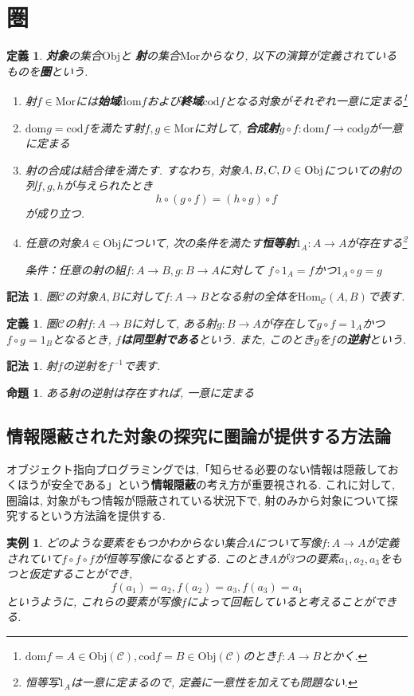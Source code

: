 \documentclass[dvipdfmx]{jsbook}
\theoremstyle{plain}
\newtheorem{Def}[thm]{定義}
\newtheorem{Notation}[thm]{記法}
\newtheorem{Prop}[thm]{命題}
\newtheorem{example}[thm]{実例}
\begin{document}
\section{圏}
\begin{Def}
{\bf 対象}の集合$\mathrm{Obj}$と
{\bf 射}の集合$\mathrm{Mor}$からなり, 以下の演算が定義されているものを{\bf 圏}という.
\begin{enumerate}
\item 射$f\in\mathrm{Mor}$には{\bf 始域}$\mathrm{dom}f$および{\bf 終域}$\mathrm{cod}f$となる対象がそれぞれ一意に定まる\footnote{$\mathrm{dom}f=A\in\mathrm{Obj}(\mathscr{C}),\mathrm{cod}f=B\in\mathrm{Obj}(\mathscr{C})$のとき$f:A\rightarrow B$とかく.}
\item $\mathrm{dom} g=\mathrm{cod}f$を満たす射$f,g\in\mathrm{Mor}$に対して,
{\bf 合成射}$g\circ f:\mathrm{dom}f\rightarrow\mathrm{cod}g$が一意に定まる
\item 射の合成は結合律を満たす. すなわち, 対象$A,B,C,D\in\rm{Obj}$についての射の列$f,g,h$が与えられたとき
\[
h\circ(g\circ f)=(h\circ g)\circ f
\]
が成り立つ.
\item 任意の対象$A\in\mathrm{Obj}$について,
次の条件を満たす{\bf 恒等射}$1_{A}:A\rightarrow A$が存在する\footnote{恒等写$1_{A}$は一意に定まるので, 定義に一意性を加えても問題ない.}

条件：任意の射の組$f:A\rightarrow B, g:B\rightarrow A$に対して
$f\circ 1_A=f$かつ$1_A\circ g=g$
\end{enumerate}
\end{Def}
\begin{Notation}
圏$\mathscr{C}$の対象$A,B$に対して$f:A\rightarrow B$となる射の全体を$\mathrm{Hom}_{\mathscr{C}}(A,B)$で表す.
\end{Notation}
\begin{Def}
圏$\mathscr{C}$の射$f:A\rightarrow B$に対して,
ある射$g:B\rightarrow A$が存在して$g\circ f=1_A$かつ$f\circ g=1_B$となるとき,
{\bf $f$は同型射である}という. また, このとき$g$を$f$の{\bf 逆射}という.
\end{Def}
\begin{Notation}
射$f$の逆射を$f^{-1}$で表す.
\end{Notation}
\begin{Prop}
ある射の逆射は存在すれば, 一意に定まる
\end{Prop}
\subsection{情報隠蔽された対象の探究に圏論が提供する方法論}
オブジェクト指向プログラミングでは,「知らせる必要のない情報は隠蔽しておくほうが安全である」という{\bf 情報隠蔽}の考え方が重要視される.
これに対して, 圏論は, 対象がもつ情報が隠蔽されている状況下で, 射のみから対象について探究するという方法論を提供する.
\begin{example}
どのような要素をもつかわからない集合$A$について写像$f:A\rightarrow A$が定義されていて$f\circ f\circ f$が恒等写像になるとする.
このとき$A$が3つの要素$a_1,a_2,a_3$をもつと仮定することができ,
\[
f(a_1)=a_2, f(a_2)=a_3, 
f(a_3)=a_1
\]
というように, これらの要素が写像$f$によって回転していると考えることができる.
\end{example}
\end{document}

